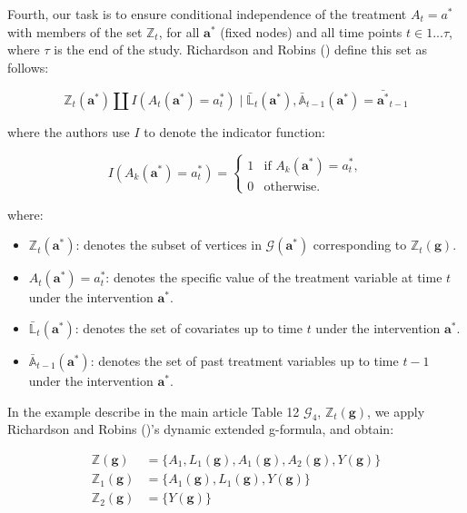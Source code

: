 \documentclass[
  single column]{article}
\providecommand{\tightlist}{%
  \setlength{\itemsep}{0pt}\setlength{\parskip}{0pt}}\usepackage{longtable,booktabs,array}
\begin{document}
Fourth, our task is to ensure conditional independence of the treatment
\(A_t = a^*\) with members of the set \(\mathbb{Z}_t\), for all
\(\mathbf{a}^*\) (fixed nodes) and all time points \(t \in 1...\tau\),
where \(\tau\) is the end of the study. Richardson and Robins
() define this set as follows:

\[
\mathbb{Z}_t(\mathbf{a}^*) \coprod I(A_t(\mathbf{a}^*) = a^*_t) \mid \bar{\mathbb{L}}_t(\mathbf{a}^*), \bar{\mathbb{A}}_{t-1}(\mathbf{a}^*) = \bar{\mathbf{a}^*}_{t-1}
\]

where the authors use \(I\) to denote the indicator function:

\[
I(A_k(\mathbf{a}^*) = a^*_t) = 
\begin{cases} 
1 & \text{if } A_k(\mathbf{a}^*) = a^*_t, \\
0 & \text{otherwise}.
\end{cases}
\]

where:

\begin{itemize}
\tightlist
\item
  \textbf{\(\mathbb{Z}_t(\mathbf{a}^*)\)}: denotes the subset of
  vertices in \(\mathcal{G}(\mathbf{a}^*)\) corresponding to
  \(\mathbb{Z}_t(\mathbf{g})\).
\item
  \textbf{\(A_t(\mathbf{a}^*) = a^*_t\)}: denotes the specific value of
  the treatment variable at time \(t\) under the intervention
  \(\mathbf{a}^*\).
\item
  \textbf{\(\bar{\mathbb{L}}_t(\mathbf{a}^*)\)}: denotes the set of
  covariates up to time \(t\) under the intervention \(\mathbf{a}^*\).
\item
  \textbf{\(\bar{\mathbb{A}}_{t-1}(\mathbf{a}^*)\)}: denotes the set of
  past treatment variables up to time \(t-1\) under the intervention
  \(\mathbf{a}^*\).
\end{itemize}

In the example describe in the main article Table 12 \(\mathcal{G}_4\),
\(\mathbb{Z}_t(\mathbf{g})\), we apply Richardson and Robins
()'s dynamic extended g-formula, and
obtain:

\[
\begin{aligned}
\mathbb{Z}(\mathbf{g}) &= \{A_1, L_1(\mathbf{g}), A_1(\mathbf{g}), A_2(\mathbf{g}), Y(\mathbf{g})\} \\
\mathbb{Z}_1(\mathbf{g}) &= \{A_1(\mathbf{g}), L_1(\mathbf{g}), Y(\mathbf{g})\} \\
\mathbb{Z}_2(\mathbf{g}) &= \{Y(\mathbf{g})\}
\end{aligned}
\]
\end{document}
